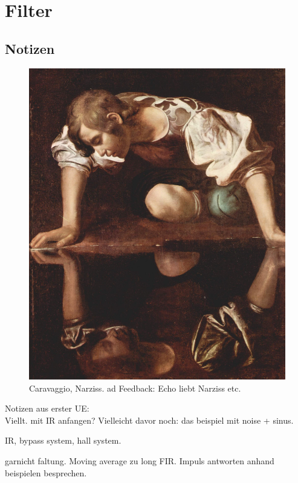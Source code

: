 \chapter{Filter}
\label{chap:filters}
\section{Notizen}


\begin{figure}[H]
	\begin{center}
		\includegraphics[width = 14cm]{img/Narciss_Caravaggio.jpg}
		\caption{Caravaggio, Narziss. ad Feedback: Echo liebt Narziss etc.}
		\label{fig:name}
	\end{center}
\end{figure}


Notizen aus erster UE:\\
Viellt. mit IR anfangen?
Vielleicht davor noch: das beispiel mit noise + sinus.

IR, bypass system, hall system.

garnicht faltung. Moving average zu long FIR.
Impuls antworten anhand beispielen besprechen.


